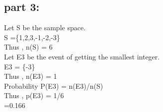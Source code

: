 \documentclass{article}
\begin{document}
\subsection{part 3:}
Let S be the sample space.\\
S =\{1,2,3,-1,-2,-3\}\\
Thus  ,   n(S) = 6\\
Let E3 be the event of getting the smallest integer.\\
E3 = \{-3\}\\
Thus   ,  n(E3) = 1\\
Probability   P(E3) = n(E3)/n(S)\\
Thus   ,  p(E3) = 1/6\\
=0.166\\

             
\end{document}
